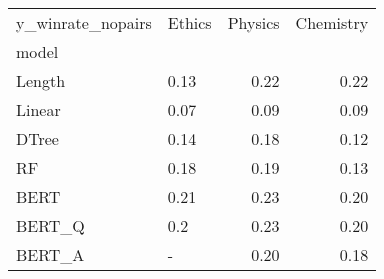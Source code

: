 \begin{tabular}{llrr}
\toprule
y\_winrate\_nopairs & Ethics &  Physics &  Chemistry \\
model  &        &          &            \\
\midrule
Length &   0.13 &     0.22 &       0.22 \\
Linear &   0.07 &     0.09 &       0.09 \\
DTree  &   0.14 &     0.18 &       0.12 \\
RF     &   0.18 &     0.19 &       0.13 \\
BERT   &   0.21 &     0.23 &       0.20 \\
BERT\_Q &    0.2 &     0.23 &       0.20 \\
BERT\_A &      - &     0.20 &       0.18 \\
\bottomrule
\end{tabular}
